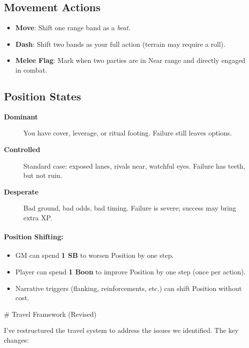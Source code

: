 \subsection*{Movement Actions}
\label{sec:movement-actions}
\begin{itemize}
\item \textbf{Move}: Shift one range band as a \emph{beat}.
\item \textbf{Dash}: Shift two bands as your full action (terrain may require a roll).
\item \textbf{Melee Flag}: Mark when two parties are in Near range and directly engaged in combat.
\end{itemize}

\subsection*{Position States}
\begin{description}
\item[\textbf{Dominant}]  You have cover, leverage, or ritual footing. Failure still leaves options.
\item[\textbf{Controlled}]  Standard case: exposed lanes, rivals near, watchful eyes. Failure has teeth, but not ruin.
\item[\textbf{Desperate}]  Bad ground, bad odds, bad timing. Failure is severe; success may bring extra XP.
\end{description}

\paragraph{Position Shifting:}
\begin{itemize}
\item GM can spend \textbf{1 SB} to worsen Position by one step.
\item Player can spend \textbf{1 Boon} to improve Position by one step (once per action).
\item Narrative triggers (flanking, reinforcements, etc.) can shift Position without cost.
\end{itemize}

# Travel Framework (Revised)

I've restructured the travel system to address the issues we identified. The key changes:

